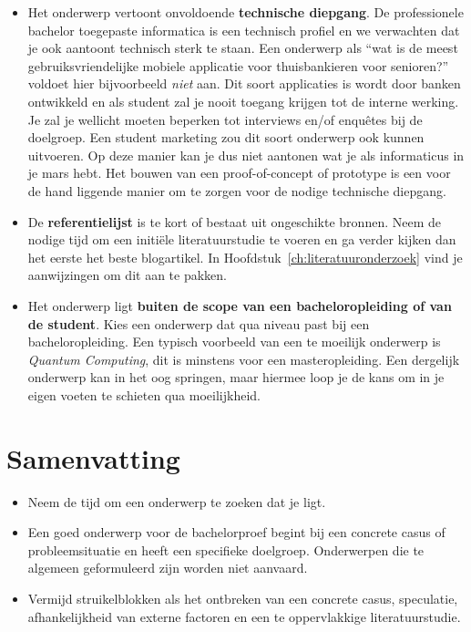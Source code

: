 \begin{itemize}
  \item Het onderwerp vertoont onvoldoende \textbf{technische diepgang}. De professionele bachelor toegepaste informatica is een technisch profiel en we verwachten dat je ook aantoont technisch sterk te staan. Een onderwerp als ``wat is de meest gebruiksvriendelijke mobiele applicatie voor thuisbankieren voor senioren?'' voldoet hier bijvoorbeeld \textit{niet} aan. Dit soort applicaties is wordt door banken ontwikkeld en als student zal je nooit toegang krijgen tot de interne werking. Je zal je wellicht moeten beperken tot interviews en/of enquêtes bij de doelgroep. Een student marketing zou dit soort onderwerp ook kunnen uitvoeren. Op deze manier kan je dus niet aantonen wat je als informaticus in je mars hebt. Het bouwen van een proof-of-concept of prototype is een voor de hand liggende manier om te zorgen voor de nodige technische diepgang.

  \item De \textbf{referentielijst} is te kort of bestaat uit ongeschikte bronnen. Neem de nodige tijd om een initiële literatuurstudie te voeren en ga verder kijken dan het eerste het beste blogartikel. In Hoofdstuk~\ref{ch:literatuuronderzoek} vind je aanwijzingen om dit aan te pakken.

  \item Het onderwerp ligt \textbf{buiten de scope van een bacheloropleiding of van de student}. Kies een onderwerp dat qua niveau past bij een bacheloropleiding. Een typisch voorbeeld van een te moeilijk onderwerp is \textit{Quantum Computing}, dit is minstens voor een masteropleiding. Een dergelijk onderwerp kan in het oog springen, maar hiermee loop je de kans om in je eigen voeten te schieten qua moeilijkheid.
\end{itemize}

\section{Samenvatting}%
\label{sec:onderwerp_samenvatting}

\begin{itemize}
  \item Neem de tijd om een onderwerp te zoeken dat je ligt.
  \item Een goed onderwerp voor de bachelorproef begint bij een concrete casus of probleemsituatie en heeft een specifieke doelgroep. Onderwerpen die te algemeen geformuleerd zijn worden niet aanvaard.
  \item Vermijd struikelblokken als het ontbreken van een concrete casus, speculatie, afhankelijkheid van externe factoren en een te oppervlakkige literatuurstudie.
\end{itemize}

